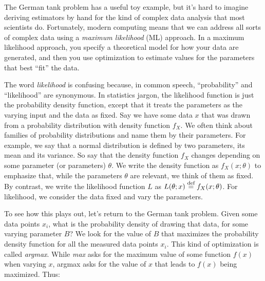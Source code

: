 The German tank problem has a useful toy example, but it's hard to imagine deriving
estimators by hand for the kind of complex data analysis that most scientists do.
Fortunately, modern computing means that we can address all sorts of complex data
using a \emph{maximum likelihood} (ML) approach. In a maximum likelihood approach, you
specify a theoretical model for how your data are generated, and then you use optimization to estimate values for the parameters that best ``fit'' the data.

The word \emph{likelihood} is confusing because, in common speech, ``probability''
and ``likelihood'' are synonymous. In statistics jargon, the likelihood function
is just the probability density function, except that it treats the parameters as the varying input
and the data as fixed. Say we have some data $x$ that was drawn from a probability 
distribution with density function $f_X$. We often think about families of probability
distributions and name them by their parameters. For example, we say that a normal
distribution is defined by two parameters, its mean and its variance. So say that
the density function $f_X$ changes depending on some parameter (or parameters) $\theta$.
We write the density function as $f_X(x; \theta)$ to emphasize that, while the
parameters $\theta$ are relevant, we think of them as fixed. By contrast, we write
the likelihood function $L$ as $L(\theta; x) \stackrel{\text{def}}{=} f_X(x; \theta)$. For likelihood,
we consider the data fixed and vary the parameters.

To see how this plays out, let's return to the German tank problem. Given some data
points $x_i$, what is the probability density of drawing that data, for some varying
parameter $B$? We look for the value of $B$ that maximizes the probability density
function for all the measured data points $x_i$. This kind of optimization is called \emph{argmax}. While \emph{max} asks for the maximum value of some function $f(x)$ when varying $x$, argmax asks for the value of $x$ that leads to $f(x)$ being maximized. Thus:

